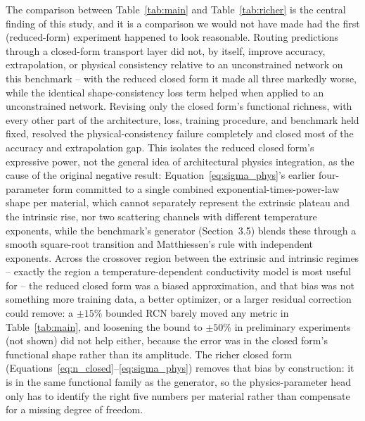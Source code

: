 \documentclass[11pt]{article}
\begin{document}
The comparison between Table~\ref{tab:main} and Table~\ref{tab:richer} is the central finding of this study, and it is a comparison we would not have made had the first (reduced-form) experiment happened to look reasonable. Routing predictions through a closed-form transport layer did not, by itself, improve accuracy, extrapolation, or physical consistency relative to an unconstrained network on this benchmark -- with the reduced closed form it made all three markedly worse, while the identical shape-consistency loss term helped when applied to an unconstrained network. Revising only the closed form's functional richness, with every other part of the architecture, loss, training procedure, and benchmark held fixed, resolved the physical-consistency failure completely and closed most of the accuracy and extrapolation gap. This isolates the reduced closed form's expressive power, not the general idea of architectural physics integration, as the cause of the original negative result: Equation~\ref{eq:sigma_phys}'s earlier four-parameter form committed to a single combined exponential-times-power-law shape per material, which cannot separately represent the extrinsic plateau and the intrinsic rise, nor two scattering channels with different temperature exponents, while the benchmark's generator (Section~3.5) blends these through a smooth square-root transition and Matthiessen's rule with independent exponents. Across the crossover region between the extrinsic and intrinsic regimes -- exactly the region a temperature-dependent conductivity model is most useful for -- the reduced closed form was a biased approximation, and that bias was not something more training data, a better optimizer, or a larger residual correction could remove: a $\pm 15\%$ bounded RCN barely moved any metric in Table~\ref{tab:main}, and loosening the bound to $\pm 50\%$ in preliminary experiments (not shown) did not help either, because the error was in the closed form's functional shape rather than its amplitude. The richer closed form (Equations~\ref{eq:n_closed}--\ref{eq:sigma_phys}) removes that bias by construction: it is in the same functional family as the generator, so the physics-parameter head only has to identify the right five numbers per material rather than compensate for a missing degree of freedom.
\end{document}
